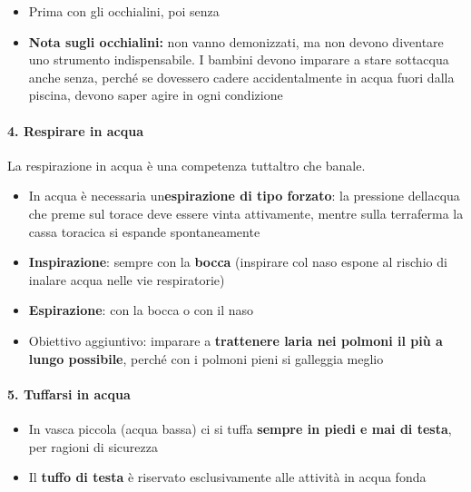 \documentclass[a4paper,11pt]{article}
\providecommand{\tightlist}{%
  \setlength{\itemsep}{0pt}\setlength{\parskip}{0pt}}
\begin{document}
\begin{itemize}
      \tightlist
      \item
            Prima con gli occhialini, poi senza
      \item
            \textbf{Nota sugli occhialini:} non vanno demonizzati, ma non devono
            diventare uno strumento indispensabile. I bambini devono imparare a
            stare sott\textquotesingle acqua anche senza, perché se dovessero
            cadere accidentalmente in acqua fuori dalla piscina, devono saper
            agire in ogni condizione
\end{itemize}

\paragraph{4. Respirare in acqua}\label{respirare-in-acqua}

La respirazione in acqua è una competenza tutt\textquotesingle altro che
banale.

\begin{itemize}
      \tightlist
      \item
            In acqua è necessaria un\textquotesingle{}\textbf{espirazione di tipo
                  forzato}: la pressione dell\textquotesingle acqua che preme sul torace
            deve essere vinta attivamente, mentre sulla terraferma la cassa
            toracica si espande spontaneamente
      \item
            \textbf{Inspirazione}: sempre con la \textbf{bocca} (inspirare col
            naso espone al rischio di inalare acqua nelle vie respiratorie)
      \item
            \textbf{Espirazione}: con la bocca o con il naso
      \item
            Obiettivo aggiuntivo: imparare a \textbf{trattenere
                  l\textquotesingle aria nei polmoni il più a lungo possibile}, perché
            con i polmoni pieni si galleggia meglio
\end{itemize}

\paragraph{5. Tuffarsi in acqua}\label{tuffarsi-in-acqua}

\begin{itemize}
      \tightlist
      \item
            In vasca piccola (acqua bassa) ci si tuffa \textbf{sempre in piedi e
                  mai di testa}, per ragioni di sicurezza
      \item
            Il \textbf{tuffo di testa} è riservato esclusivamente alle attività in
            acqua fonda
\end{itemize}
\end{document}
